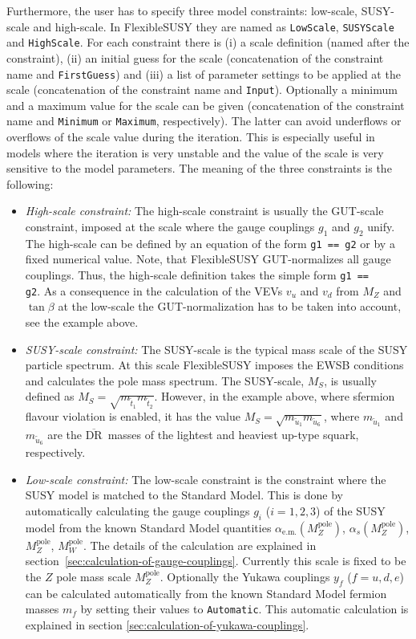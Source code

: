 \documentclass[final,3p,11pt,pdflatex]{elsarticle}
\makeatletter
\newcommand{\fs}{FlexibleSUSY\@\xspace}
\newcommand{\code}[1]{\lstinline|#1|}  %
\newcommand{\textoverline}[1]{$\overline{\mbox{#1}}$}
\newcommand{\DRbar}{\textoverline{DR}\xspace}
\newcommand{\pole}{\text{pole}}
\makeatother
\begin{document}
Furthermore, the user has to specify three model constraints:
low-scale, SUSY-scale and high-scale.  In \fs they are named as
\code{LowScale}, \code{SUSYScale} and \code{HighScale}.  For each
constraint there is (i) a scale definition (named after the
constraint), (ii) an initial guess for the scale (concatenation of the
constraint name and \code{FirstGuess}) and (iii) a list of parameter
settings to be applied at the scale (concatenation of the constraint
name and \code{Input}).  Optionally a minimum and a maximum value for
the scale can be given (concatenation of the constraint name and
\code{Minimum} or \code{Maximum}, respectively).  The latter can avoid
underflows or overflows of the scale value during the iteration.  This
is especially useful in models where the iteration is very unstable
and the value of the scale is very sensitive to the model parameters.
The meaning of the three constraints is the following:
%
\begin{itemize}
\item \emph{High-scale constraint:} The high-scale constraint is
  usually the GUT-scale constraint, imposed at the scale where the
  gauge couplings $g_1$ and $g_2$ unify.  The high-scale can be
  defined by an equation of the form \code{g1 == g2} or by a fixed
  numerical value.  Note, that \fs GUT-normalizes all gauge couplings.
  Thus, the high-scale definition takes the simple form \code{g1 ==
    g2}.  As a consequence in the calculation of the VEVs $v_u$ and
  $v_d$ from $M_Z$ and $\tan\beta$ at the low-scale the
  GUT-normalization has to be taken into account, see the example
  above.
%
\item \emph{SUSY-scale constraint:} The SUSY-scale is the typical mass
  scale of the SUSY particle spectrum.  At this scale \fs imposes the
  EWSB conditions and calculates the pole mass spectrum.  The
  SUSY-scale, $M_S$, is usually defined as $M_S =
  \sqrt{m_{\tilde{t}_1}m_{\tilde{t}_2}}$.  However, in the example
  above, where sfermion flavour violation is enabled, it has the value
  $M_S = \sqrt{m_{\tilde{u}_1}m_{\tilde{u}_6}}$, where
  $m_{\tilde{u}_1}$ and $m_{\tilde{u}_6}$ are the \DRbar\ masses of
  the lightest and heaviest up-type squark, respectively.
%
\item \emph{Low-scale constraint:} The low-scale constraint is the
  constraint where the SUSY model is matched to the Standard Model.
  This is done by automatically calculating the gauge couplings $g_i$
  ($i=1,2,3$) of the SUSY model from the known Standard Model
  quantities $\alpha_{\text{e.m.}}(M_Z^\pole)$,
  $\alpha_{s}(M_Z^\pole)$, $M_Z^\pole$, $M_W^\pole$.  The details of
  the calculation are explained in
  section~\ref{sec:calculation-of-gauge-couplings}.  Currently this
  scale is fixed to be the $Z$ pole mass scale $M_Z^\pole$.
  Optionally the Yukawa couplings $y_f$ ($f=u,d,e$) can be calculated
  automatically from the known Standard Model fermion masses $m_f$ by
  setting their values to \code{Automatic}.  This automatic
  calculation is explained in section
  \ref{sec:calculation-of-yukawa-couplings}.
\end{itemize}
\end{document}
